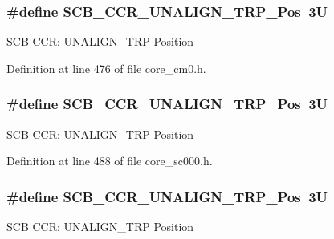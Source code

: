 \subsubsection[{\texorpdfstring{S\+C\+B\+\_\+\+C\+C\+R\+\_\+\+U\+N\+A\+L\+I\+G\+N\+\_\+\+T\+R\+P\+\_\+\+Pos}{SCB_CCR_UNALIGN_TRP_Pos}}]{\setlength{\rightskip}{0pt plus 5cm}\#define S\+C\+B\+\_\+\+C\+C\+R\+\_\+\+U\+N\+A\+L\+I\+G\+N\+\_\+\+T\+R\+P\+\_\+\+Pos~3U}\hypertarget{group___c_m_s_i_s___s_c_b_gac4e4928b864ea10fc24dbbc57d976229}{}\label{group___c_m_s_i_s___s_c_b_gac4e4928b864ea10fc24dbbc57d976229}
S\+CB C\+CR\+: U\+N\+A\+L\+I\+G\+N\+\_\+\+T\+RP Position 

Definition at line 476 of file core\+\_\+cm0.\+h.

\subsubsection[{\texorpdfstring{S\+C\+B\+\_\+\+C\+C\+R\+\_\+\+U\+N\+A\+L\+I\+G\+N\+\_\+\+T\+R\+P\+\_\+\+Pos}{SCB_CCR_UNALIGN_TRP_Pos}}]{\setlength{\rightskip}{0pt plus 5cm}\#define S\+C\+B\+\_\+\+C\+C\+R\+\_\+\+U\+N\+A\+L\+I\+G\+N\+\_\+\+T\+R\+P\+\_\+\+Pos~3U}\hypertarget{group___c_m_s_i_s___s_c_b_gac4e4928b864ea10fc24dbbc57d976229}{}\label{group___c_m_s_i_s___s_c_b_gac4e4928b864ea10fc24dbbc57d976229}
S\+CB C\+CR\+: U\+N\+A\+L\+I\+G\+N\+\_\+\+T\+RP Position 

Definition at line 488 of file core\+\_\+sc000.\+h.

\subsubsection[{\texorpdfstring{S\+C\+B\+\_\+\+C\+C\+R\+\_\+\+U\+N\+A\+L\+I\+G\+N\+\_\+\+T\+R\+P\+\_\+\+Pos}{SCB_CCR_UNALIGN_TRP_Pos}}]{\setlength{\rightskip}{0pt plus 5cm}\#define S\+C\+B\+\_\+\+C\+C\+R\+\_\+\+U\+N\+A\+L\+I\+G\+N\+\_\+\+T\+R\+P\+\_\+\+Pos~3U}\hypertarget{group___c_m_s_i_s___s_c_b_gac4e4928b864ea10fc24dbbc57d976229}{}\label{group___c_m_s_i_s___s_c_b_gac4e4928b864ea10fc24dbbc57d976229}
S\+CB C\+CR\+: U\+N\+A\+L\+I\+G\+N\+\_\+\+T\+RP Position 

